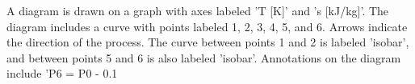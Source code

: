 A diagram is drawn on a graph with axes labeled 'T [K]' and 's [kJ/kg]'. The diagram includes a curve with points labeled 1, 2, 3, 4, 5, and 6. Arrows indicate the direction of the process. The curve between points 1 and 2 is labeled 'isobar', and between points 5 and 6 is also labeled 'isobar'. Annotations on the diagram include 'P6 = P0 - 0.1%